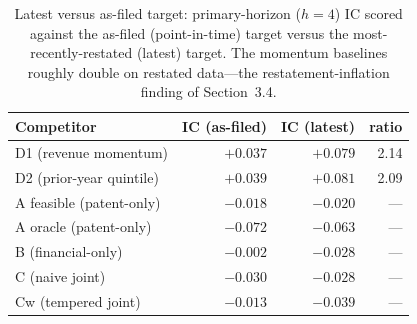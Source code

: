 \documentclass[11pt]{article}
\begin{document}
\begin{table}[htbp]
  \centering
  \caption{Latest versus as-filed target: primary-horizon ($h=4$) IC scored against the as-filed (point-in-time) target versus the most-recently-restated (latest) target. The momentum baselines roughly double on restated data---the restatement-inflation finding of Section~3.4.}
  \label{tab:latest}
  \begin{tabular}{lrrr}
    \toprule
    Competitor & IC (as-filed) & IC (latest) & ratio \\
    \midrule
    D1 (revenue momentum) & $+0.037$ & $+0.079$ & 2.14 \\
    D2 (prior-year quintile) & $+0.039$ & $+0.081$ & 2.09 \\
    A feasible (patent-only) & $-0.018$ & $-0.020$ & --- \\
    A oracle (patent-only) & $-0.072$ & $-0.063$ & --- \\
    B (financial-only) & $-0.002$ & $-0.028$ & --- \\
    C (naive joint) & $-0.030$ & $-0.028$ & --- \\
    Cw (tempered joint) & $-0.013$ & $-0.039$ & --- \\
    \bottomrule
  \end{tabular}
\end{table}
\end{document}
